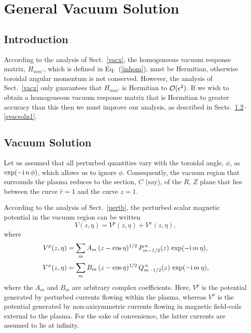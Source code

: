 \documentclass[12pt,prb,aps]{revtex4-1}
\begin{document}
\section{General Vacuum Solution}\label{vacxx}
\subsection{Introduction}
According to the analysis of Sect.~\ref{vacx}, the homogeneous vacuum response matrix, $H_{mm'}$, which is defined in Eq.~(\ref{inhom}), must be
Hermitian, otherwise toroidal angular momentum is not conserved. However, the analysis of Sect.~\ref{vacx} only guarantees that
$H_{mm'}$ is Hermitian to ${\cal O}(\epsilon^2)$. If we wish to obtain a homogeneous vacuum response matrix that is Hermitian to greater accuracy than
this then we must improve our analysis, as described in Sects.~\ref{svacsoln}--\ref{svacsoln1}.

\subsection{Vacuum Solution}\label{svacsoln}
Let us assumed that all perturbed quantities  vary with the toroidal angle, $\phi$, as $\exp(-{\rm i}\,n\,\phi)$, which allows us to ignore $\phi$.
Consequently, the vacuum region that surrounds the plasma reduces to the section, $C$ (say), of the $R$, $Z$ plane that lies between the
curve $\hat{r}=1$ and the curve $z=1$. 

According to the analysis of Sect.~\ref{pertb}, the perturbed scalar magnetic potential in the vacuum region can be written
\begin{equation}
V(z,\eta)= V^p(z,\eta)+V^x(z,\eta),
\end{equation}
where
\begin{align}
V^p(z,\eta) &=\sum_m A_m\,(z-\cos\eta)^{1/2}\,P_{m-1/2}^{\,n}(z)\,\exp(-{\rm i}\,m\,\eta),\\[0.5ex]
V^x(z,\eta) &=\sum_m B_m\,(z-\cos\eta)^{1/2}\,Q_{m-1/2}^{\,n}(z)\,\exp(-{\rm i}\,m\,\eta),
\end{align}
where the $A_m$ and $B_m$ are arbitrary complex coefficients. 
Here, $V^p$ is the potential generated by perturbed currents flowing within the plasma, whereas $V^x$ is the potential
generated by non-axisymmetric currents flowing in magnetic field-coils external to the plasma. For the sake
of convenience, the latter
currents are assumed to lie at infinity.
\end{document}
